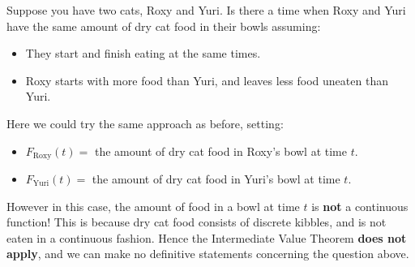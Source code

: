 \documentclass{ximera}
\begin{document}
\begin{example}
Suppose you have two cats, Roxy and Yuri. Is there a time when Roxy
and Yuri have the same amount of dry cat food in their bowls assuming:
  \begin{itemize}
  \item They start and finish eating at the same times.
  \item Roxy starts with more food than Yuri, and leaves less food
    uneaten than Yuri.
  \end{itemize}

\begin{explanation} 
  Here we could try the same approach as before, setting:
  \begin{itemize}
    \item $F_{\mathrm{Roxy}}(t) =$ the amount of dry cat food in Roxy's bowl at time $t$.
    \item $F_{\mathrm{Yuri}}(t) =$ the amount of dry cat food in Yuri's bowl at time $t$.
  \end{itemize}
  However in this case, the amount of food in a bowl at time $t$ is
  \textbf{not} a continuous function! This is because dry cat food
  consists of discrete kibbles, and is not eaten in a continuous
  fashion. Hence the Intermediate Value Theorem \textbf{does not
    apply}, and we can make no definitive statements concerning the
  question above.
\end{explanation}
\end{example}
\end{document}
